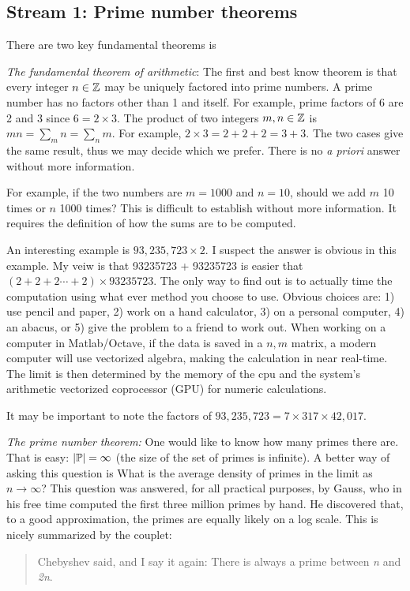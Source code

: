 \documentclass{ximera}
\begin{document}
\subsection{Stream 1: Prime number theorems \label{FT:PN}}
There are two key fundamental theorems is
\Be
\label{FT:AR}
\item \emph{The fundamental theorem of arithmetic}:
The first and best know theorem is that every integer $n\in \Z$ may be uniquely factored into prime
numbers.
A prime number has no factors other than 1 and itself.
For example, prime factors of 6 are 2 and 3 since $6=2\times 3$. 
The product of two integers $m,n\in\Z$ is $mn=\sum_m n = \sum_n m$. For example, $2\times3 = 2+2+2 = 3+3$.
The two cases give the same result, thus we may decide which we prefer.
There is no \emph{a priori} answer without more information.

For example, if the two numbers are $m=1000$ and $n=10$, should we add $m$ 10 times or $n$ 1000 times?
This is difficult to establish without more information.
It requires the definition of how the sums are to be computed.

An interesting example is $93,235,723\times2$.
I suspect the answer is obvious in this example.
My veiw is that 93235723 + 93235723 is easier that $(2+2+2 \cdots +2)\times93235723$.
The only way to find out is to actually time the computation using what ever method you choose to use.
Obvious choices are:
1) use pencil and paper,
2) work on a hand calculator,
3) on a personal computer,
4) an abacus, or
5) give the problem to a friend to work out.
When working on a computer in Matlab/Octave, if the data is saved in a $n,m$ matrix, a modern
computer will use vectorized algebra, making the calculation in near real-time.
The limit is then determined by the memory of the cpu and the system's arithmetic vectorized
coprocessor (GPU) for numeric calculations.

It may be important to note the factors of $93,235,723 = 7 \times 317 \times 42,017$.

\item \emph{The prime number theorem:}
One would like to know how many primes there are. That is easy: $|\P|=\infty$  (the
size of the set of primes is infinite).  A better way of asking this question is
What is the average density of primes in the limit as $n \rightarrow \infty$?
This question was answered, for all practical purposes, by Gauss, who in his free time computed
the first three million primes by hand. He discovered that, to a good approximation,
the primes are equally likely on a log scale. This is nicely summarized by the couplet:
 \begin{quote}
Chebyshev said, and I say it again: There is always a prime between \emph{n} and \emph{2n}.
\label{FT:PNT}
 \end{quote}
 
\end{document}
